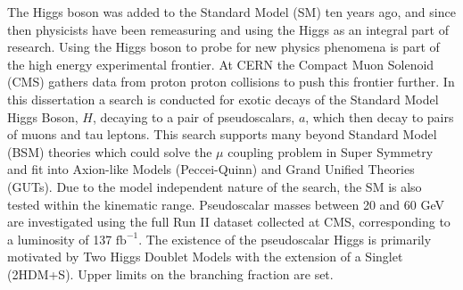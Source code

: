 The Higgs boson was added to the Standard Model (SM) ten years ago, and since then physicists have been remeasuring and using the Higgs as an integral part of research.  
Using the Higgs boson to probe for new physics phenomena is part of the high energy experimental frontier. 
At CERN the Compact Muon Solenoid (CMS) gathers data from proton proton collisions to push this frontier further. 
In this dissertation a search is conducted for exotic decays of the Standard Model Higgs Boson, $H$, decaying to a pair of pseudoscalars, $a$, which then decay to pairs of muons and tau leptons. 
This search supports many beyond Standard Model (BSM) theories which could solve the $\mu$ coupling problem in Super Symmetry and fit into Axion-like Models (Peccei-Quinn) and Grand Unified Theories (GUTs). 
Due to the model independent nature of the search, the SM is also tested within the kinematic range.  
Pseudoscalar masses between 20 and 60 GeV are investigated using the full Run II dataset collected at CMS, corresponding to a luminosity of 137 $\text{fb}^{-1}$. The existence of the pseudoscalar Higgs is primarily motivated by Two Higgs Doublet Models with the extension of a Singlet (2HDM+S). Upper limits on the branching fraction are set.
